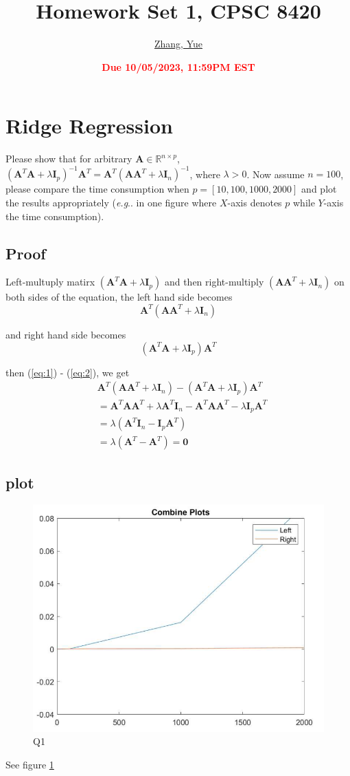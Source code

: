 \documentclass[11pt]{article}
\title{{\bf Homework Set 1, CPSC 8420}}
\author{\Large\underline{Zhang, Yue}}
\date{\textbf{\Large\textcolor{red}{Due 10/05/2023, 11:59PM EST}}}
\makeatletter
\newcommand{\R}{\mathbb{R}}
\newcommand{\minimize}{\operatorname*{minimize\ }}
\newcommand{\mtx}[1]{\mathbf{#1}}
\newcommand{\vct}[1]{\mathbf{#1}}
\def \mA {\mtx{A}}
\def \mI {\mtx{I}}
\def \mU {\mtx{U}}
\def \mX {\mtx{X}}
\def \vv {\vct{v}}
\def \R {\mathbb{R}}
\DeclareRobustCommand\onedot{\futurelet\@let@token\@onedot}
\def\@onedot{\ifx\@let@token.\else.\null\fi\xspace}
\def\eg{\emph{e.g}\onedot} \def\Eg{\emph{E.g}\onedot}
\makeatother
\begin{document}
\maketitle

\section{Ridge Regression}
Please show that for arbitrary $\mA\in\R^{n\times p}$, $(\mA^T\mA+\lambda\mI_p)^{-1}\mA^T=\mA^T(\mA\mA^T+\lambda\mI_n)^{-1}$, where $\lambda>0$. Now assume $n=100$, please compare the time consumption when $p=[10,100,1000,2000]$ and plot the results appropriately (\eg in one figure where $X$-axis denotes $p$ while $Y$-axis the time consumption).

\subsection{Proof}
Left-multuply matirx $(\mA^T\mA+\lambda\mI_p)$ and then right-multiply $(\mA\mA^T+\lambda\mI_n)$ on both sides of the equation,
the left hand side becomes 
\begin{equation}
	\mA^T(\mA\mA^T+\lambda\mI_n)\label{eq:1}
\end{equation}

and right hand side becomes
\begin{equation}
	(\mA^T\mA+\lambda\mI_p)\mA^T\label{eq:2}
\end{equation}

then (\ref{eq:1}) - (\ref{eq:2}), we get 
\begin{align*}
	& \mA^T(\mA\mA^T+\lambda\mI_n) - (\mA^T\mA+\lambda\mI_p)\mA^T\\
	& = \mA^T\mA\mA^T+\lambda\mA^T\mI_n - \mA^T\mA\mA^T-\lambda\mI_p\mA^T\\
	& = \lambda(\mA^T\mI_n - \mI_p\mA^T)\\
	& = \lambda(\mA^T - \mA^T) = \mtx{0}
\end{align*}

\subsection{plot}
\begin{figure}[h!]
	\centering
	\includegraphics[width=0.5\linewidth]{Q1.png}
	\caption{Q1}
	\label{fig:Q1}
\end{figure}
See figure \ref{fig:Q1}
\end{document}
